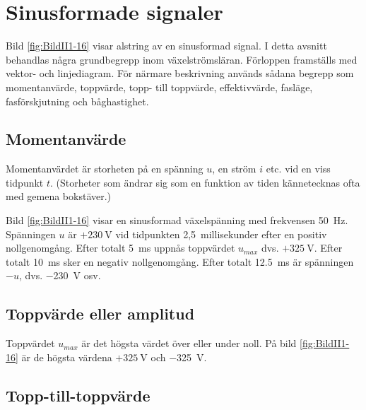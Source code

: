 \section{Sinusformade signaler}


Bild \ref{fig:BildII1-16} visar alstring av en sinusformad signal.
I detta avsnitt behandlas några grundbegrepp inom växelströmsläran.
Förloppen framställs med vektor- och linjediagram.
För närmare beskrivning används sådana begrepp som momentanvärde,
toppvärde, topp- till toppvärde, effektivvärde, fasläge, fasförskjutning och
båghastighet.

\subsection{Momentanvärde}

Momentanvärdet är storheten på en spänning \(u\), en ström \(i\) etc. vid en
viss tidpunkt \(t\).
(Storheter som ändrar sig som en funktion av tiden kännetecknas ofta med gemena
bokstäver.)

Bild \ref{fig:BildII1-16} visar en sinusformad växelspänning med frekvensen
\SI{50}{\hertz}.
Spänningen \(u\) är \(+230\ \text{V}\) vid tidpunkten 2,5~millisekunder efter en
positiv nollgenomgång.
Efter totalt \SI{5}{\milli\second} uppnås toppvärdet \(u_{max}\) dvs. \(+325\ \text{V}\).
Efter totalt \SI{10}{\milli\second} sker en negativ nollgenomgång.
Efter totalt \SI{12,5}{\milli\second} är spänningen \(-u\), dvs. \SI{-230}{\volt} osv.

\subsection{Toppvärde eller amplitud}
\label{toppvärde}

Toppvärdet \(u_{max}\) är det högsta värdet över eller under noll.
På bild \ref{fig:BildII1-16} är de högsta värdena \(+325\ \text{V}\) och
\SI{-325}{\volt}.

\subsection{Topp-till-toppvärde}
\label{peak-to-peak-värde}

